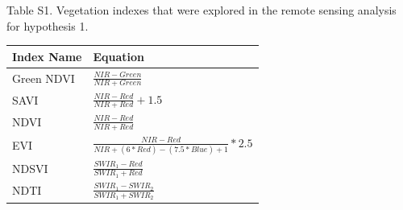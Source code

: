 \documentclass[
  11pt,
]{article}
\author{}
\date{\vspace{-2.5em}}
\begin{document}
\renewcommand{\thetable}{S\arabic{table}}      \setcounter{table}{0} \renewcommand{\thefigure}{S\arabic{figure}}

Table S1. Vegetation indexes that were explored in the remote sensing
analysis for hypothesis 1.

\begin{longtable}[]{@{}ll@{}}
\toprule
Index Name & Equation\tabularnewline
\midrule
\endhead
Green NDVI & \(\frac{NIR - Green}{NIR + Green}\)\tabularnewline
SAVI & \(\frac{NIR - Red}{NIR+Red} + 1.5\)\tabularnewline
NDVI & \(\frac{NIR - Red}{NIR + Red}\)\tabularnewline
EVI &
\(\frac{NIR - Red}{NIR + (6 * Red) - (7.5 * Blue) + 1}*2.5\)\tabularnewline
NDSVI & \(\frac{SWIR_1 - Red}{SWIR_1 + Red}\)\tabularnewline
NDTI & \(\frac{SWIR_1 - SWIR_2}{SWIR_1 + SWIR_2}\)\tabularnewline
\bottomrule
\end{longtable}

\newpage
\end{document}
